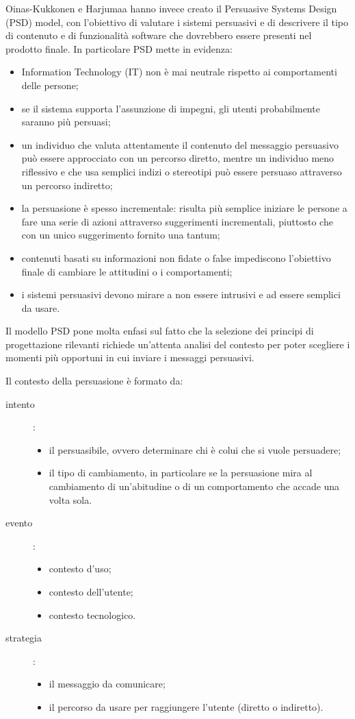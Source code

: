 Oinas-Kukkonen e Harjumaa hanno invece creato il Persuasive Systems Design (PSD) model, con l'obiettivo di valutare i sistemi persuasivi e di descrivere il tipo di contenuto e di funzionalità software che dovrebbero essere presenti nel prodotto finale.
In particolare PSD mette in evidenza:
\begin{itemize}
    \item Information Technology (IT) non è mai neutrale rispetto ai comportamenti delle persone;
    \item se il sistema supporta l'assunzione di impegni, gli utenti probabilmente saranno più persuasi;
    \item un individuo che valuta attentamente il contenuto del messaggio persuasivo può essere approcciato con un percorso diretto, mentre un individuo meno riflessivo e che usa semplici indizi o stereotipi può essere persuaso attraverso un percorso indiretto;
    \item la persuasione è spesso incrementale: risulta più semplice iniziare le persone a fare una serie di azioni attraverso suggerimenti incrementali, piuttosto che con un unico suggerimento fornito una tantum;
    \item contenuti basati su informazioni non fidate o false impediscono l'obiettivo finale di cambiare le attitudini o i comportamenti;
    \item i sistemi persuasivi devono mirare a non essere intrusivi e ad essere semplici da usare.
\end{itemize}

Il modello PSD pone molta enfasi sul fatto che la selezione dei principi di progettazione rilevanti richiede un'attenta analisi del contesto per poter scegliere i momenti più opportuni in cui inviare i messaggi persuasivi.

Il contesto della persuasione è formato da:
\begin{description}
    \item[intento]:
    \begin{itemize}
        \item il persuasibile, ovvero determinare chi è colui che si vuole persuadere;
        \item il tipo di cambiamento, in particolare se la persuasione mira al cambiamento di un'abitudine o di un comportamento che accade una volta sola.
    \end{itemize}
    \item[evento]:
    \begin{itemize}
        \item contesto d'uso;
        \item contesto dell'utente;
        \item contesto tecnologico.
    \end{itemize}
    \item[strategia]:
    \begin{itemize}
        \item il messaggio da comunicare;
        \item il percorso da usare per raggiungere l'utente (diretto o indiretto).
    \end{itemize} 
\end{description}

